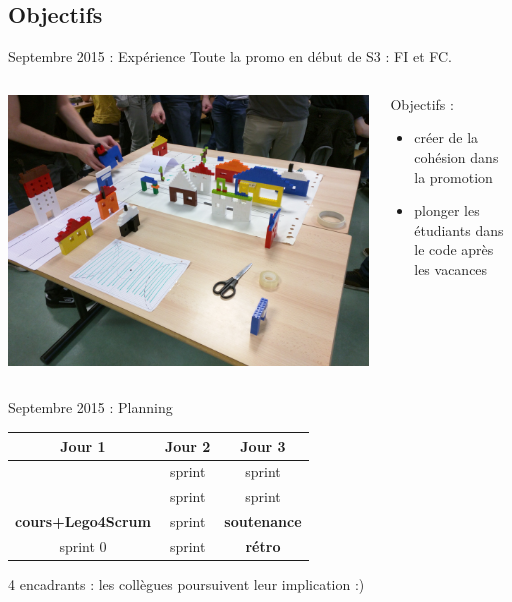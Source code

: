 \documentclass{beamer}
\begin{document}
\subsection{Objectifs}
\begin{frame}{Septembre 2015 : Expérience}
  Toute la promo en début de S3 : FI et FC.

  \begin{columns}
    \begin{column}{0.5\textwidth}
      \begin{center}
        \includegraphics[width=\textwidth]{includes/201509_lego.jpg}      
      \end{center}
    \end{column}
    \begin{column}{0.5\textwidth}
  Objectifs : 
  \begin{itemize}
    \item créer de la cohésion dans la promotion
    \item plonger les étudiants dans le code après les vacances
  \end{itemize}
    \end{column}
  \end{columns}
\end{frame}

\begin{frame}{Septembre 2015 : Planning}
  \begin{center}
    \begin{tabular}{| c | c | c |}
      \hline
      \textbf{Jour 1} & \textbf{Jour 2} & \textbf{Jour 3}  \\
      \hline \hline
                      & sprint          & sprint           \\
      \hline
                      & sprint          & sprint           \\
      \hline \hline
      \textbf{cours+Lego4Scrum}      & sprint          & \textbf{soutenance}       \\
      \hline
      sprint 0        & sprint          & \textbf{rétro}            \\
      \hline
    \end{tabular}
  \end{center}
    4 encadrants : les collègues poursuivent leur implication :)
\end{frame}
\end{document}
